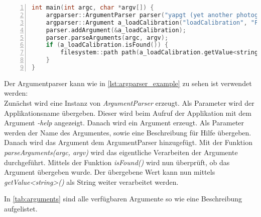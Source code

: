 \begin{lstlisting}[language=c++, numbers=left, breaklines=true, breakatwhitespace=false, label=lst:argparser_example, caption=Argparser Verwendung]
int main(int argc, char *argv[]) {
    argparser::ArgumentParser parser("yapgt (yet another photogrammetry tool)");
    argparser::Argument a_loadCalibration("loadCalibration", "Filepath to load calibration from");    
    parser.addArgument(&a_loadCalibration);
    parser.parseArguments(argc, argv);
    if (a_loadCalibration.isFound()) {
        filesystem::path path(a_loadCalibration.getValue<string>());
    }
}
\end{lstlisting}

Der Argumentparser kann wie in \autoref{lst:argparser_example} zu sehen ist verwendet werden:\\
Zunächst wird eine Instanz von \emph{ArgumentParser} erzeugt.
Als Parameter wird der Applikationsname übergeben.
Dieser wird beim Aufruf der Applikation mit dem Argument \emph{-help} angezeigt.
Danach wird ein Argument erzeugt.
Als Parameter werden der Name des Argumentes, sowie eine Beschreibung für Hilfe übergeben.
Danach wird das Argument dem ArgumentParser hinzugefügt.
Mit der Funktion \emph{parseArguments(argc, argv)} wird das eigentliche Verarbeiten der Argumente durchgeführt.
Mittels der Funktion \emph{isFound()} wird nun überprüft, ob das Argument übergeben wurde.
Der übergebene Wert kann nun mittels \emph{getValue<string>()} als String weiter verarbeitet werden.

In \autoref{tab:arguments} sind alle verfügbaren Argumente so wie eine Beschreibung aufgelistet.


